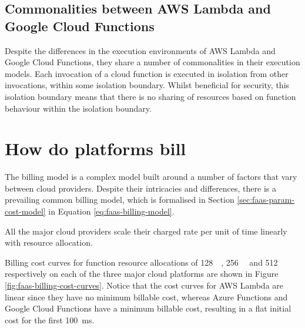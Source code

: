 \subsection{Commonalities between AWS Lambda and Google Cloud Functions}
Despite the differences in the execution environments of AWS Lambda and Google Cloud Functions, they share a number of commonalities in their execution models. Each invocation of a cloud function is executed in isolation from other invocations, within some isolation boundary. Whilst beneficial for security, this isolation boundary means that there is no sharing of resources based on function behaviour within the isolation boundary.

\section{How do \faas{} platforms bill \faaslong{}}
\label{sec:faas-billing-models}

The \faas{} billing model is a complex model built around a number of factors that vary between cloud providers. Despite their intricacies and differences, there is a prevailing common billing model, which is formalised in Section \ref{sec:faas-param-cost-model} in Equation \ref{eq:faas-billing-model}.

All the major cloud providers scale their charged rate per unit of time linearly with resource allocation.

Billing cost curves for function resource allocations of \SI{128}{\mega\byte}, \SI{256}{\mega\byte} and \SI{512}{\mega\byte} respectively on each of the three major cloud platforms are shown in Figure \ref{fig:faas-billing-cost-curves}. Notice that the cost curves for AWS Lambda are linear since they have no minimum billable cost, whereas Azure Functions and Google Cloud Functions have a minimum billable cost, resulting in a flat initial cost for the first \SI{100}{\milli\second}.

\begin{figure*}[htp]
    \centering
    \quad
    \quad
    \caption{\faas{} billing cost curves demonstrating how the costs to execute a cloud function for a particular length of time vary by memory allocation and cloud provider}
    \label{fig:faas-billing-cost-curves}
\end{figure*}

